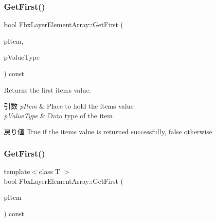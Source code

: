 \mbox{\label{class_fbx_layer_element_array_ad54e636bdab3dfb407cb0561ae6460e0}} 
\subsubsection{\texorpdfstring{Get\+First()}{GetFirst()}\hspace{0.1cm}{\footnotesize\ttfamily [1/2]}}
{\footnotesize\ttfamily bool Fbx\+Layer\+Element\+Array\+::\+Get\+First (\begin{DoxyParamCaption}\item[{void $\ast$$\ast$}]{p\+Item,  }\item[{\hyperlink{fbxpropertytypes_8h_a73913a5ddfb20e57c6f25e9e6784bd92}{E\+Fbx\+Type}}]{p\+Value\+Type }\end{DoxyParamCaption}) const}

Returns the first item\textquotesingle{}s value. 
\begin{DoxyParams}{引数}
{\em p\+Item} & Place to hold the item\textquotesingle{}s value \\
\hline
{\em p\+Value\+Type} & Data type of the item \\
\hline
\end{DoxyParams}
\begin{DoxyReturn}{戻り値}
{\ttfamily True} if the item\textquotesingle{}s value is returned successfully, {\ttfamily false} otherwise 
\end{DoxyReturn}
\mbox{\label{class_fbx_layer_element_array_ae6f77a98d976ed7afbb8c455f0d26437}} 
\subsubsection{\texorpdfstring{Get\+First()}{GetFirst()}\hspace{0.1cm}{\footnotesize\ttfamily [2/2]}}
{\footnotesize\ttfamily template$<$class T $>$ \\
bool Fbx\+Layer\+Element\+Array\+::\+Get\+First (\begin{DoxyParamCaption}\item[{T $\ast$}]{p\+Item }\end{DoxyParamCaption}) const\hspace{0.3cm}{\ttfamily [inline]}}

